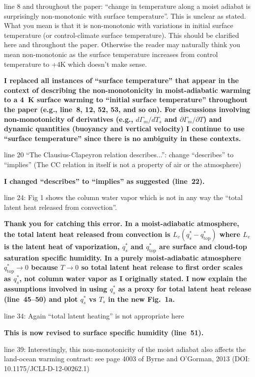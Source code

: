 \documentclass{article}
\begin{document}
line 8 and throughout the paper: ``change in temperature along a moist adiabat is surprisingly non-monotonic with surface temperature''. This is unclear as stated. What you mean is that it is non-monotonic with variations in initial surface temperature (or control-climate surface temperature). This should be clarified here and throughout the paper. Otherwise the reader may naturally think you mean non-monotonic as the surface temperature increases from control temperature to +4K which doesn't make sense.
\par
\textbf{I replaced all instances of ``surface temperature'' that appear in the context of describing the non-monotonicity in moist-adiabatic warming to a 4~K surface warming to ``initial surface temperature'' throughout the paper (e.g., line~8, 12, 52, 53, and so on). For discussions involving non-monotonicity of derivatives (e.g., $d\Gamma_m/dT_s$ and $\partial\Gamma_m/\partial T$) and dynamic quantities (buoyancy and vertical velocity) I continue to use ``surface temperature'' since there is no ambiguity in these contexts.}
\par
line 20 ``The Clausius-Clapeyron relation describes...'':  change ``describes'' to ``implies'' (The CC relation in itself is not a property of air or the atmosphere)
\par
\textbf{I changed ``describes'' to ``implies'' as suggested (line~22).}
\par
line 24: Fig 1 shows the column water vapor which is not in any way the ``total latent heat released from convection''.
\par
\textbf{Thank you for catching this error. In a moist-adiabatic atmosphere, the total latent heat released from convection is $L_v(q_s^*-q_\mathrm{top}^*)$ where $L_v$ is the latent heat of vaporization, $q_s^*$ and $q_\mathrm{top}^*$ are surface and cloud-top saturation specific humidity. In a purely moist-adiabatic atmosphere $q_\mathrm{top}^*\to 0$ because $T\to0$ so total latent heat release to first order scales as $q_s^*$, not column water vapor as I originally stated. I now explain the assumptions involved in using $q_s^*$ as a proxy for total latent heat release (line~45--50) and plot $q_s^*$ vs $T_s$ in the new Fig.~1a.}
\par
line 34: Again ``total latent heating'' is not appropriate here
\par
\textbf{This is now revised to surface specific humidity (line~51).}
\par
line 39: Interestingly, this non-monotonicity of the moist adiabat also affects the land-ocean warming contrast: see page 4003 of Byrne and O'Gorman, 2013 (DOI: 10.1175/JCLI-D-12-00262.1)
\end{document}
